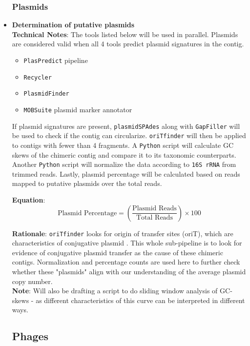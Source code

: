 \documentclass[11pt]{article}
\begin{document}
\begin{itemize}
\subsubsection{Plasmids}


	\item \textbf{Determination of putative plasmids}\\
	\textbf{Technical Notes}: The tools listed below will be used in parallel. Plasmids are considered valid when all 4 tools predict plasmid signatures in the contig.
	\begin{itemize}
		\item \texttt{PlasPredict} pipeline
		\item \texttt{Recycler}
		\item \texttt{PlasmidFinder}
		\item \texttt{MOBSuite} plasmid marker annotator
	\end{itemize}
	If plasmid signatures are present, \texttt{plasmidSPAdes} along with \texttt{GapFiller} will be used to check if the contig can circularize. \texttt{oriTfinder} will then be applied to contigs with fewer than 4 fragments. A \texttt{Python} script will calculate GC skews of the chimeric contig and compare it to its taxonomic counterparts. Another \texttt{Python} script will normalize the data according to \texttt{16S rRNA} from trimmed reads. Lastly, plasmid percentage will be calculated based on reads mapped to putative plasmids over the total reads.
	
	\textbf{Equation}:
	\[
	\text{Plasmid Percentage} = \left( \frac{\text{Plasmid Reads}}{\text{Total Reads}} \right) \times 100
	\]

	\textbf{Rationale}: \texttt{oriTfinder} looks for origin of transfer sites (oriT), which are characteristics of conjugative plasmid . This whole sub-pipeline is to look for evidence of conjugative plasmid transfer as the cause of these chimeric contigs. Normalization and percentage counts are used here to further check whether these "plasmids" align with our understanding of the average plasmid copy number. \\
	\textbf{Note}: Will also be drafting a script to do sliding window analysis of GC-skews - as different characteristics of this curve can be interpreted in different ways. 

\subsection{Phages}		
	

\end{itemize}
\end{document}
